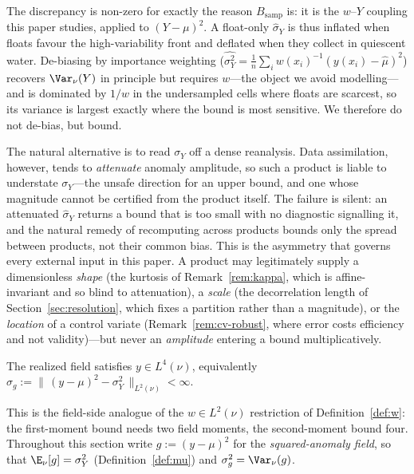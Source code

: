 The discrepancy is non-zero for exactly the reason $B_{\mathrm{samp}}$
is: it is the $w$--$Y$ coupling this paper studies, applied to
$(Y-\mu)^2$. A float-only $\hat\sigma_Y$ is thus inflated when floats
favour the high-variability front and deflated when they collect in
quiescent water. De-biasing by importance weighting
($\widehat{\sigma_Y^2}=\frac1n\sum_i w(x_i)^{-1}(y(x_i)-\hat\mu)^2$)
recovers $\Var_\nu(Y)$ in principle but requires $w$---the object we
avoid modelling---and is dominated by $1/w$ in the undersampled cells
where floats are scarcest, so its variance is largest exactly where the
bound is most sensitive. We therefore do not de-bias, but bound.

\begin{remark}
\label{rem:conservative-Y}
The natural alternative is to read $\sigma_Y$ off a dense reanalysis.
Data assimilation, however, tends to \emph{attenuate} anomaly amplitude,
so such a product is liable to understate $\sigma_Y$---the unsafe
direction for an upper bound, and one whose magnitude cannot be
certified from the product itself. The failure is silent: an attenuated
$\hat\sigma_Y$ returns a bound that is too small with no diagnostic
signalling it, and the natural remedy of recomputing across products
bounds only the spread between products, not their common bias. This is
the asymmetry that governs every external input in this paper. A product
may legitimately supply a dimensionless \emph{shape} (the kurtosis of
Remark~\ref{rem:kappa}, which is affine-invariant and so blind to
attenuation), a \emph{scale} (the decorrelation length of
Section~\ref{sec:resolution}, which fixes a partition rather than a
magnitude), or the \emph{location} of a control variate
(Remark~\ref{rem:cv-robust}, where error costs efficiency and not
validity)---but never an \emph{amplitude} entering a bound
multiplicatively.
\end{remark}

\begin{assumption}
\label{ass:l4}
The realized field satisfies $y\in L^4(\nu)$, equivalently
$\sigma_g:=\big\|\,(y-\mu)^2-\sigma_Y^2\,\big\|_{L^2(\nu)}<\infty$.
\end{assumption}

This is the field-side analogue of the $w\in L^2(\nu)$ restriction of
Definition~\ref{def:w}: the first-moment bound needs two field moments,
the second-moment bound four. Throughout this section write
$g:=(y-\mu)^2$ for the \emph{squared-anomaly field}, so that
$\E_\nu[g]=\sigma_Y^2$ (Definition~\ref{def:mu}) and
$\sigma_g^2=\Var_\nu(g)$.

